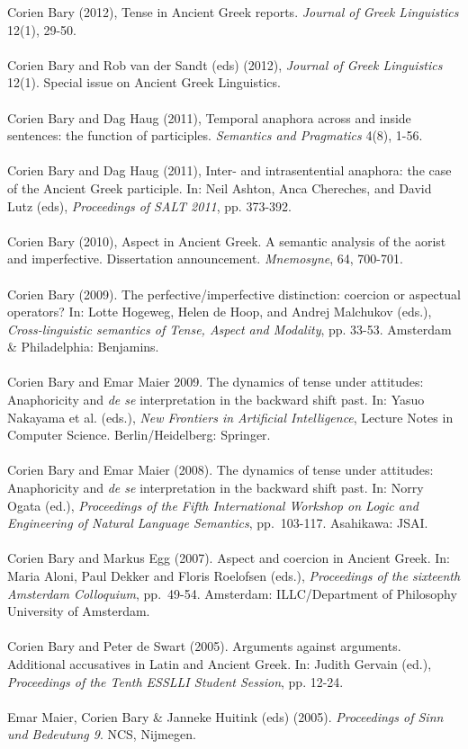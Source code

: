 \documentclass[a4paper,11pt]{article}
\begin{document}
Corien Bary (2012), Tense in Ancient Greek reports. \emph{Journal of Greek Linguistics} 12(1), 29-50.\\\\
Corien Bary and Rob van der Sandt (eds) (2012), \emph{Journal of Greek Linguistics} 12(1). Special issue on Ancient Greek Linguistics.\\\\
Corien Bary and Dag Haug (2011), Temporal anaphora across and inside sentences: the function of participles. \emph{Semantics and Pragmatics} 4(8), 1-56.\\\\
Corien Bary and Dag Haug (2011), Inter- and intrasentential anaphora: the case of the Ancient Greek participle. In: Neil Ashton, Anca Chereches, and David Lutz (eds), \emph{Proceedings of SALT 2011}, pp. 373-392.\\\\
Corien Bary (2010), Aspect in Ancient Greek. A semantic analysis of the aorist and imperfective. Dissertation announcement. \emph{Mnemosyne}, 64, 700-701.\\\\
Corien Bary (2009). The perfective/imperfective distinction: coercion or aspectual operators? In: Lotte Hogeweg, Helen de Hoop, and Andrej Malchukov (eds.), \emph{Cross-linguistic semantics of Tense, Aspect and Modality}, pp. 33-53. Amsterdam \& Philadelphia: Benjamins.\\\\ 
Corien Bary and Emar Maier 2009. The dynamics of tense under attitudes: Anaphoricity and \emph{de se} interpretation in the backward shift past. In: Yasuo Nakayama et al. (eds.), \emph{New Frontiers in Artificial Intelligence}, Lecture Notes in Computer Science. Berlin/Heidelberg: Springer.\\\\ 
Corien Bary and Emar Maier (2008). The dynamics of tense under attitudes: Anaphoricity and \emph{de se} interpretation in the backward shift past. In: Norry Ogata (ed.), \emph{Proceedings of the Fifth International Workshop on Logic and Engineering of Natural Language Semantics}, pp.\ 103-117. Asahikawa: JSAI.\\\\
Corien Bary and Markus Egg (2007). Aspect and coercion in Ancient Greek. In: Maria Aloni, Paul Dekker and Floris 
Roelofsen (eds.), \emph{Proceedings of the sixteenth Amsterdam Colloquium}, pp.\ 49-54.  Amsterdam: ILLC/Department of Philosophy 
University of Amsterdam.\\\\
Corien Bary and Peter de Swart (2005). Arguments against
arguments. Additional accusatives in Latin and Ancient Greek. In:
Judith Gervain (ed.), \emph{Proceedings of the Tenth ESSLLI
Student
Session}, pp. 12-24.\\\\
Emar Maier, Corien Bary \& Janneke Huitink (eds) (2005).
\emph{Proceedings of Sinn und Bedeutung 9}. NCS, Nijmegen.\\
\end{document}
